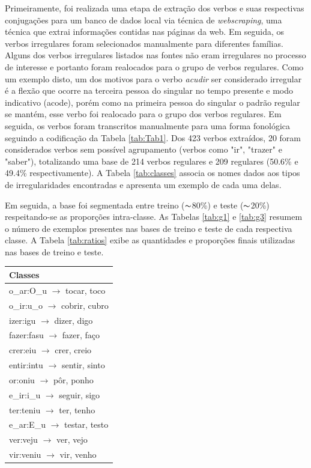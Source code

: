 Primeiramente, foi realizada uma etapa de extração dos verbos e suas respectivas conjugações para um banco de dados local via técnica de \textit{webscraping}, uma técnica que extrai informações contidas nas páginas da web. Em seguida, os verbos irregulares foram selecionados manualmente para diferentes famílias. Alguns dos verbos irregulares listados nas fontes não eram irregulares no processo de interesse e portanto foram realocados para o grupo de verbos regulares. Como um exemplo disto, um dos motivos para o verbo \textit{acudir} ser considerado irregular é a flexão que ocorre na terceira pessoa do singular no tempo presente e modo indicativo (acode), porém como na primeira pessoa do singular o padrão regular se mantém, esse verbo foi realocado para o grupo dos verbos regulares. Em seguida, os verbos foram transcritos manualmente para uma forma fonológica seguindo a codificação da Tabela \ref{tab:Tab1}. Dos 423 verbos extraídos, 20 foram considerados verbos sem possível agrupamento (verbos como "ir", "trazer" e "saber"), totalizando uma base de 214 verbos regulares e 209 regulares (50.6\% e 49.4\% respectivamente). A Tabela \ref{tab:classes} associa os nomes dados aos tipos de irregularidades encontradas e apresenta um exemplo de cada uma delas. 

Em seguida, a base foi segmentada entre treino ($\thicksim$80\%) e teste ($\thicksim$20\%) respeitando-se as proporções intra-classe. As Tabelas \ref{tab:g1} e \ref{tab:g3} resumem o número de exemplos presentes nas bases de treino e teste de cada respectiva classe. A Tabela \ref{tab:ratios} exibe as quantidades e proporções finais utilizadas nas bases de treino e teste.


\begin{table}[H]
\begin{center}
\begin{tabular}{l}
Classes\\
\toprule
o\_ar:O\_u $\rightarrow$ tocar, toco\\
o\_ir:u\_o $\rightarrow$ cobrir, cubro\\
izer:igu $\rightarrow$ dizer, digo\\
fazer:fasu $\rightarrow$ fazer, faço\\
crer:eiu $\rightarrow$ crer, creio\\
entir:intu $\rightarrow$ sentir, sinto\\
or:oniu $\rightarrow$ pôr, ponho\\
e\_ir:i\_u $\rightarrow$ seguir, sigo\\
ter:teniu $\rightarrow$ ter, tenho\\
e\_ar:E\_u $\rightarrow$ testar, testo\\
ver:veju $\rightarrow$ ver, vejo\\
vir:veniu $\rightarrow$ vir, venho
\end{tabular}
\end{center}
\end{table}
\label{tab:classes}


